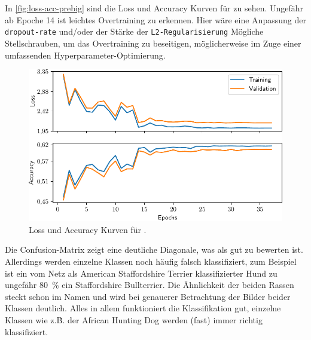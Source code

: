 \section{\PreBig}

In \autoref{fig:loss-acc-prebig} sind die Loss und Accuracy Kurven für \PreBig
zu sehen. Ungefähr ab Epoche 14 ist leichtes Overtraining zu erkennen. Hier
wäre eine Anpassung der \texttt{dropout-rate} und/oder der Stärke der \texttt{L2-Regularisierung}
Mögliche Stellschrauben, um das Overtraining zu beseitigen, möglicherweise im Zuge
einer umfassenden Hyperparameter-Optimierung.

\begin{figure}
  \centering
  \includegraphics[scale=0.8]{pics/ergebnisse/PreBigDogNN/history_epoch.pdf}
  \caption{Loss und Accuracy Kurven für \PreBig.}
  \label{fig:loss-acc-prebig}
\end{figure}

Die Confusion-Matrix zeigt eine deutliche Diagonale, was als gut zu bewerten ist.
Allerdings werden einzelne Klassen noch häufig falsch klassifiziert, zum Beispiel
ist ein vom Netz als American Staffordshire Terrier klassifizierter Hund zu ungefähr
\SI{80}{\percent} ein Staffordshire Bullterrier. Die Ähnlichkeit der beiden Rassen
steckt schon im Namen und wird bei genauerer Betrachtung der Bilder beider Klassen
deutlich. Alles in allem funktioniert die Klassifikation gut, einzelne Klassen
wie z.\.B. der African Hunting Dog werden (fast) immer richtig klassifiziert.

